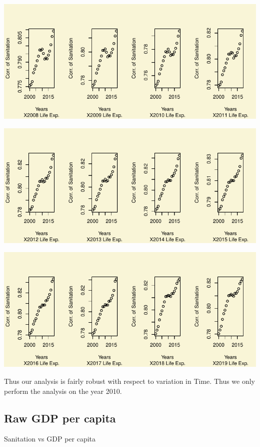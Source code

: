 \documentclass[
]{article}
\begin{document}
\includegraphics{main_files/figure-pdf/unnamed-chunk-30-3.pdf}

\includegraphics{main_files/figure-pdf/unnamed-chunk-30-4.pdf}

\includegraphics{main_files/figure-pdf/unnamed-chunk-30-5.pdf}

Thus our analysis is fairly robust with respect to variation in Time.
Thus we only perform the analysis on the year 2010.

\hypertarget{raw-gdp-per-capita}{%
\subsection{Raw GDP per capita}\label{raw-gdp-per-capita}}

Sanitation vs GDP per capita
\end{document}
